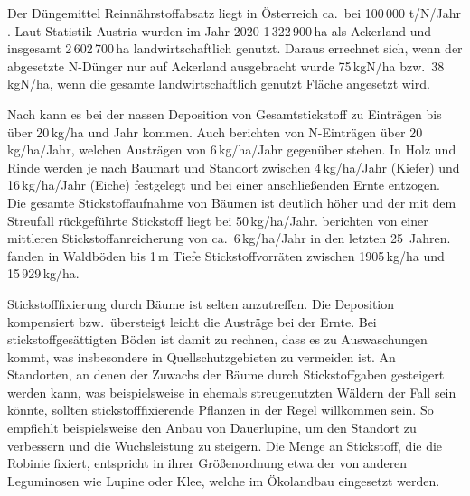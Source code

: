 \documentclass[twocolumn]{scrartcl}
\begin{document}
Der Düngemittel Reinnährstoffabsatz liegt in Österreich ca.\ bei 100\,000
t/N/Jahr \citep{ama2024duengemittel}. Laut Statistik Austria wurden im Jahr 2020
1\,322\,900\,ha als Ackerland und insgesamt 2\,602\,700\,ha landwirtschaftlich
genutzt. Daraus errechnet sich, wenn der abgesetzte N-Dünger nur auf Ackerland
ausgebracht wurde 75\,kgN/ha bzw.\ 38\,kgN/ha, wenn die gesamte
landwirtschaftlich genutzt Fläche angesetzt wird.

Nach \citet{uba1998deposition} kann es bei der nassen Deposition von
Gesamtstickstoff zu Einträgen bis über 20\,kg/ha und Jahr kommen. Auch
\citet{raspe2018stickstoff} berichten von N-Einträgen über
20\,kg/ha/Jahr, welchen Austrägen von 6\,kg/ha/Jahr gegenüber
stehen. In Holz und Rinde werden je nach Baumart und Standort zwischen
4\,kg/ha/Jahr (Kiefer) und 16\,kg/ha/Jahr (Eiche) festgelegt und bei
einer anschließenden Ernte entzogen. Die gesamte Stickstoffaufnahme
von Bäumen ist deutlich höher und der mit dem Streufall rückgeführte
Stickstoff liegt bei 50\,kg/ha/Jahr. \citet{raspe2018stickstoff}
berichten von einer mittleren Stickstoffanreicherung von
ca.\ 6\,kg/ha/Jahr in den letzten 25~Jahren.
\citet{emberger1965stickstoff} fanden in Waldböden bis 1\,m Tiefe
Stickstoffvorräten zwischen 1905\,kg/ha und 15\,929\,kg/ha.

Stickstofffixierung durch Bäume ist selten anzutreffen.
Die Deposition kompensiert bzw.\ übersteigt leicht die Austräge bei
der Ernte. Bei stickstoffgesättigten Böden ist damit zu rechnen, dass
es zu Auswaschungen kommt, was insbesondere in Quellschutzgebieten zu
vermeiden ist. An Standorten, an denen der Zuwachs der Bäume durch
Stickstoffgaben gesteigert werden kann, was beispielsweise in ehemals
streugenutzten Wäldern der Fall sein könnte, sollten
stickstofffixierende Pflanzen in der Regel willkommen sein. So
empfiehlt beispielsweise \citet{wiedemann1951ertragskunde} den Anbau
von Dauerlupine, um den Standort zu verbessern und die Wuchsleistung zu
steigern. Die Menge an Stickstoff, die die Robinie fixiert, entspricht
in ihrer Größenordnung etwa der von anderen Leguminosen wie Lupine
oder Klee, welche im Ökolandbau eingesetzt werden.
\end{document}

